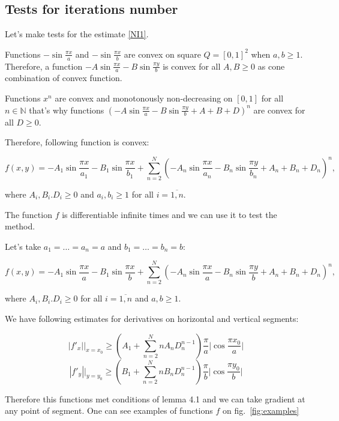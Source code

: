 \documentclass[12pt]{article}
\begin{document}
\subsection{Tests for iterations number}

Let's make tests for the estimate \eqref{NI1}.

Functions $-\sin\frac{\pi x}{a}$ and $-\sin\frac{\pi x}{b}$ are convex on square $Q = [0,1]^2$ when $a,b\geq 1$. Therefore, a function $-A\sin\frac{\pi x}{a} - B\sin\frac{\pi y}{b}$ is convex for all $A,B\geq 0$ as cone combination of convex function.

Functions $x^n$ are convex and monotonously non-decreasing on $[0, 1]$ for all $n \in \mathbb{N}$ that's why functions $\left(-A\sin\frac{\pi x}{a} - B\sin\frac{\pi y}{b} + A + B + D\right)^n$ are convex for all $D\geq 0$.

Therefore, following function is convex:

$$f(x,y) = -A_1\sin\frac{\pi x}{a_1} - B_1\sin\frac{\pi x}{b_1} + \sum\limits_{n=2}^N\left(-A_n\sin\frac{\pi x}{a_n} - B_n\sin\frac{\pi y}{b_n} + A_n + B_n + D_n\right)^n,$$

where $A_i, B_i. D_i\geq 0$ and $a_i, b_i \geq 1$ for all $i = \overline{1, n}$.

The function $f$ is differentiable infinite times and we can use it to test the method.

Let's take $a_1 = \dots = a_n = a$ and $b_1 = \dots = b_n = b$:

$$f(x,y) = -A_1\sin\frac{\pi x}{a} - B_1\sin\frac{\pi x}{b} + \sum\limits_{n=2}^N\left(-A_n\sin\frac{\pi x}{a} - B_n\sin\frac{\pi y}{b} + A_n + B_n + D_n\right)^n,$$

where $A_i, B_i. D_i\geq 0$ for all $i = \overline{1, n}$ and $a, b \geq 1$.

We have following estimates for derivatives on horizontal and vertical segments:

$$|f'_x|\Big|_{x = x_0} \geq \left(A_1 + \sum\limits_{n=2}^N n A_n D_n^{n-1}\right)\frac{\pi}{a}\Big|\cos \frac{\pi x_0}{a}\Big|$$
$$|f'_y|\Big|_{y = y_0} \geq \left(B_1 + \sum\limits_{n=2}^N n B_n D_n^{n-1}\right)\frac{\pi}{b}\Big|\cos \frac{\pi y_0}{b}\Big|$$

Therefore this functions met conditions of lemma 4.1 and we can take gradient at any point of segment. One can see examples of functions $f$ on fig.~\ref{fig:examples}
\end{document}
